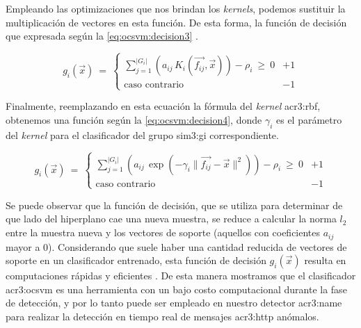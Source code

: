 Empleando las optimizaciones que nos brindan los \textit{kernels}, podemos
sustituir la multiplicación de vectores en esta función. De esta forma,
la función de decisión que expresada según la \autoref{eq:ocsvm:decision3}
\citep{perdisci2006using}. %

\begin{equation}
    \label{eq:ocsvm:decision3}
    g_{i}(\vec{x})
    \ = \
    \begin{cases}
        \sum_{j=1}^{\lvert G_{i} \rvert}
        \left(
            a_{ij} \, K_{i}(\vec{f_{ij}}, \vec{x})
        \right)
        - \rho_{i} \ \geqslant \ 0  & +1 \\
        \text{caso contrario}       & -1
    \end{cases}
\end{equation}

Finalmente, reemplazando en esta ecuación la fórmula del \textit{kernel}
\gls{acr3:rbf}, obtenemos una función según la \autoref{eq:ocsvm:decision4},
donde $\gamma_{i}$ es el parámetro del \textit{kernel} para el
clasificador del grupo \gls{sim3:gi} correspondiente.

\begin{equation}
    \label{eq:ocsvm:decision4}
    g_{i}(\vec{x})
    \ = \
    \begin{cases}
        \sum_{j=1}^{\lvert G_{i} \rvert}
        \left(
            a_{ij} \,
            \exp(
                - \gamma_{i} \lVert \vec{f_{ij}} - \vec{x} \lVert^2
            )
        \right)
        - \rho_{i} \ \geqslant \ 0  & +1 \\
        \text{caso contrario}       & -1
    \end{cases}
\end{equation}

Se puede observar que la función de decisión, que se utiliza para determinar
de que lado del hiperplano cae una nueva muestra, se reduce a calcular
la norma $l_{2}$ entre la muestra nueva y los vectores de soporte (aquellos
con coeficientes $a_{ij}$ mayor a 0). Considerando que suele haber una
cantidad reducida de vectores de soporte en un clasificador entrenado,
esta función de decisión $g_{i}(\vec{x})$ resulta en computaciones rápidas
y eficientes \citep{perdisci2006using}. %
De esta manera mostramos que el clasificador \gls{acr3:ocsvm} es una
herramienta con un bajo costo computacional durante la fase de detección,
y por lo tanto puede ser empleado en nuestro detector \gls{acr3:name}
para realizar la detección en tiempo real de mensajes \gls{acr3:http}
anómalos.


